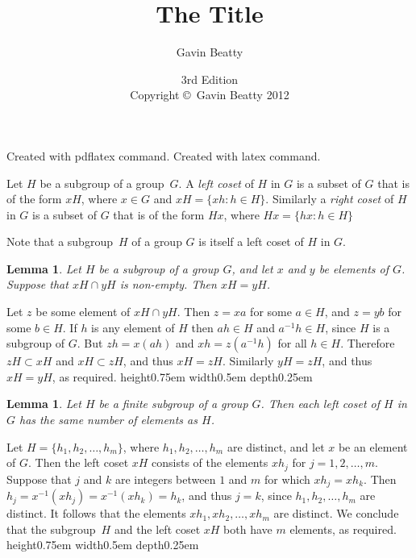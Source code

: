 \documentclass[12pt]{article}
\newtheorem{lemma}[theorem]{Lemma}
\newenvironment{proof}[1][Proof]{\begin{trivlist} %
\item[\hskip \labelsep {\bfseries #1}]}{\end{trivlist}}
\newenvironment{definition}[1][Definition]{\begin{trivlist} %
\item[\hskip \labelsep {\bfseries #1}]}{\end{trivlist}}
\newcommand{\qed}{\nobreak \ifvmode \relax \else %
      \ifdim\lastskip<1.5em \hskip-\lastskip %
      \hskip1.5em plus0em minus0.5em \fi \nobreak %
      \vrule height0.75em width0.5em depth0.25em\fi}
\begin{document}
\title{The Title}
\author{Gavin Beatty}
\date{3rd Edition\\[3pt]
Copyright \copyright\ Gavin Beatty 2012}
\maketitle

\tableofcontents

\ifpdf
    Created with pdflatex command.
\else
    Created with latex command.
\fi

\begin{definition}
Let $H$ be a subgroup of a group~$G$.  A \emph{left coset}
of $H$ in $G$ is a subset of $G$ that is of the form $xH$,
where $x \in G$ and $xH = \{ xh : h \in H \}$.
Similarly a \emph{right coset} of $H$ in $G$ is a subset
of $G$ that is of the form $Hx$, where
$Hx = \{ hx : h \in H \}$
\end{definition}

Note that a subgroup~$H$ of a group $G$ is itself a
left coset of $H$ in $G$.

\begin{lemma}
\label{LeftCosetsDisjoint}
Let $H$ be a subgroup of a group $G$, and let $x$ and $y$ be
elements of $G$.  Suppose that $xH \cap yH$ is non-empty.
Then $xH = yH$.
\end{lemma}

\begin{proof}
Let $z$ be some element of $xH \cap yH$.  Then $z = xa$
for some $a \in H$, and $z = yb$ for some $b \in H$.
If $h$ is any element of $H$ then $ah \in H$ and
$a^{-1}h \in H$, since $H$ is a subgroup of $G$.
But $zh = x(ah)$ and $xh = z(a^{-1}h)$ for all $h \in H$.
Therefore $zH \subset xH$ and $xH \subset zH$, and thus
$xH = zH$.  Similarly $yH = zH$, and thus $xH = yH$,
as required.\qed
\end{proof}

\begin{lemma}
\label{SizeOfLeftCoset}
Let $H$ be a finite subgroup of a group $G$.  Then each left
coset of $H$ in $G$ has the same number of elements as $H$.
\end{lemma}

\begin{proof}
Let $H = \{ h_1, h_2,\ldots, h_m\}$, where
$h_1, h_2,\ldots, h_m$ are distinct, and let $x$ be an
element of $G$.  Then the left coset $xH$ consists of
the elements $x h_j$ for $j = 1,2,\ldots,m$.
Suppose that $j$ and $k$ are integers between
$1$ and $m$ for which $x h_j = x h_k$.  Then
$h_j = x^{-1} (x h_j) = x^{-1} (x h_k) = h_k$,
and thus $j = k$, since $h_1, h_2,\ldots, h_m$
are distinct.  It follows that the elements
$x h_1, x h_2,\ldots, x h_m$ are distinct.
We conclude that the subgroup~$H$ and the left
coset $xH$ both have $m$ elements,
as required.\qed
\end{proof}
\end{document}
